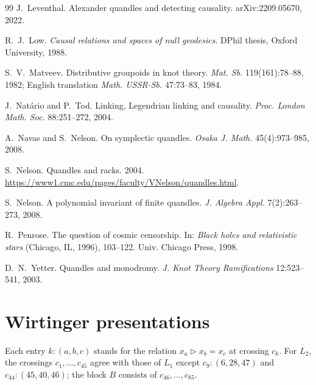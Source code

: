 \documentclass[11pt]{article}
\theoremstyle{definition}
\newcommand{\tr}{\triangleright}
\begin{document}
\begin{thebibliography}{99}
 J.~Leventhal. Alexander quandles and detecting causality. arXiv:2209.05670, 2022.

 R.~J.~Low. \emph{Causal relations and spaces of null geodesics}. DPhil thesis, Oxford
University, 1988.

 S.~V.~Matveev. Distributive groupoids in knot theory. \emph{Mat. Sb.} 119(161):78--88, 1982;
English translation \emph{Math. USSR-Sb.} 47:73--83, 1984.

 J.~Nat\'ario and P.~Tod. Linking, Legendrian linking and causality. \emph{Proc. London
Math. Soc.} 88:251--272, 2004.

 A.~Navas and S.~Nelson. On symplectic quandles. \emph{Osaka J. Math.} 45(4):973--985, 2008.

 S.~Nelson. Quandles and racks. 2004.
\url{https://www1.cmc.edu/pages/faculty/VNelson/quandles.html}.

 S.~Nelson. A polynomial invariant of finite quandles. \emph{J. Algebra Appl.}
7(2):263--273, 2008.

 R.~Penrose. The question of cosmic censorship. In: \emph{Black holes and relativistic
stars} (Chicago, IL, 1996), 103--122. Univ. Chicago Press, 1998.

 D.~N.~Yetter. Quandles and monodromy. \emph{J. Knot Theory Ramifications} 12:523--541, 2003.

\end{thebibliography}

\appendix
\section{Wirtinger presentations}

Each entry $k\colon(a,b,c)$ stands for the relation $x_a\tr x_b=x_c$ at crossing $c_k$. For $L_2$, the
crossings $c_1,\dots,c_{45}$ agree with those of $L_1$ except $c_9\colon(6,28,47)$ and
$c_{44}\colon(45,40,46)$; the block $B$ consists of $c_{46},\dots,c_{85}$.
\end{document}
